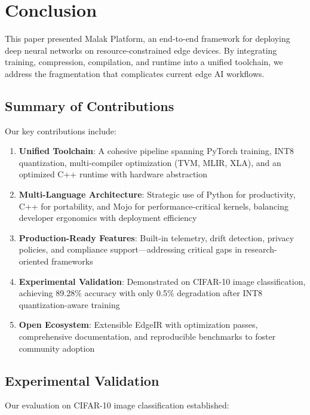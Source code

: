 \section{Conclusion}

This paper presented Malak Platform, an end-to-end framework for deploying deep neural networks on resource-constrained edge devices. By integrating training, compression, compilation, and runtime into a unified toolchain, we address the fragmentation that complicates current edge AI workflows.

\subsection{Summary of Contributions}

Our key contributions include:

\begin{enumerate}
\item \textbf{Unified Toolchain}: A cohesive pipeline spanning PyTorch training, INT8 quantization, multi-compiler optimization (TVM, MLIR, XLA), and an optimized C++ runtime with hardware abstraction

\item \textbf{Multi-Language Architecture}: Strategic use of Python for productivity, C++ for portability, and Mojo for performance-critical kernels, balancing developer ergonomics with deployment efficiency

\item \textbf{Production-Ready Features}: Built-in telemetry, drift detection, privacy policies, and compliance support—addressing critical gaps in research-oriented frameworks

\item \textbf{Experimental Validation}: Demonstrated on CIFAR-10 image classification, achieving 89.28\% accuracy with only 0.5\% degradation after INT8 quantization-aware training

\item \textbf{Open Ecosystem}: Extensible EdgeIR with optimization passes, comprehensive documentation, and reproducible benchmarks to foster community adoption
\end{enumerate}

\subsection{Experimental Validation}

Our evaluation on CIFAR-10 image classification established:

